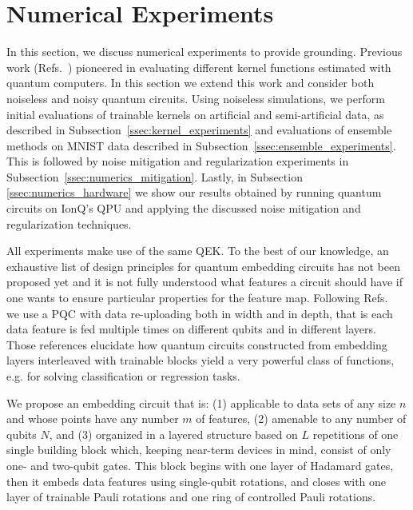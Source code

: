 \documentclass[twocolumn,superscriptaddress,nofootinbib]{revtex4-2}
\begin{document}
\section{Numerical Experiments}
\label{sec:numerical_experiments}

    In this section, we discuss numerical experiments to provide grounding. 
    Previous work (Refs.~\cite{schuldSupervisedLearningQuantum2018a,havlicekSupervisedLearningQuantum2019,bartkiewicz2020ExperimentalKernelFinite}) pioneered in evaluating different kernel functions estimated with quantum computers. In this section we extend this work and consider both noiseless and noisy quantum circuits. Using noiseless simulations,  we perform initial evaluations of trainable kernels on artificial and semi-artificial data, as described in Subsection~\ref{ssec:kernel_experiments} and evaluations of ensemble methods on MNIST data described in Subsection~\ref{ssec:ensemble_experiments}. This is followed by noise mitigation and regularization experiments in Subsection~\ref{ssec:numerics_mitigation}. Lastly, in Subsection \ref{ssec:numerics_hardware} we show our results obtained by running quantum circuits on IonQ's QPU and applying the discussed noise mitigation and regularization techniques.

    All experiments make use of the same \ac{QEK}.
    To the best of our knowledge, an exhaustive list of design principles for quantum embedding circuits has not been proposed yet and it is not fully understood what features a circuit should have if one wants to ensure particular properties for the feature map.
    Following Refs.~\cite{perez-salinasDataReuploadingUniversal2020, schuldEffectDataEncoding2020, mitarai2018CircuitLearning} we use a PQC with data re-uploading both in width and in depth, that is each data feature is fed multiple times on different qubits and in different layers.
    Those references elucidate how quantum circuits constructed from embedding layers interleaved with trainable blocks yield a very powerful class of functions, e.g. for solving classification or regression tasks.
    
    We propose an embedding circuit that is: (1) applicable to data sets of any size $n$ and whose points have any number $m$ of features, (2) amenable to any number of qubits $N$, and (3) organized in a layered structure based on $L$ repetitions of one single building block which, keeping near-term devices in mind, consist of only one- and two-qubit gates.
    This block begins with one layer of Hadamard gates, then it embeds data features using single-qubit rotations, and closes with one layer of trainable Pauli rotations and one ring of controlled Pauli rotations.
    
\end{document}
